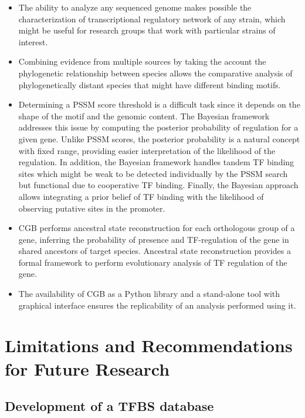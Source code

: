 \documentclass[12pt]{article}
\begin{document}
\begin{itemize}

\item The ability to analyze any sequenced genome makes possible the
  characterization of transcriptional regulatory network of any strain, which
  might be useful for research groups that work with particular strains of
  interest.

\item Combining evidence from multiple sources by taking the account the
  phylogenetic relationship between species allows the comparative analysis of
  phylogenetically distant species that might have different binding motifs.

\item Determining a PSSM score threshold is a difficult task since it depends
  on the shape of the motif and the genomic content. The Bayesian framework
  addresses this issue by computing the posterior probability of regulation for
  a given gene. Unlike PSSM scores, the posterior probability is a natural
  concept with fixed range, providing easier interpretation of the likelihood
  of the regulation. In addition, the Bayesian framework handles tandem TF
  binding sites which might be weak to be detected individually by the PSSM
  search but functional due to cooperative TF binding. Finally, the Bayesian
  approach allows integrating a prior belief of TF binding with the likelihood
  of observing putative sites in the promoter.

\item CGB performs ancestral state reconstruction for each orthologous group of
  a gene, inferring the probability of presence and TF-regulation of the gene
  in shared ancestors of target species. Ancestral state reconstruction
  provides a formal framework to perform evolutionary analysis of TF regulation
  of the gene.

\item The availability of CGB as a Python library and a stand-alone tool with
  graphical interface ensures the replicability of an analysis performed using
  it.
\end{itemize}

\section{Limitations and Recommendations for Future Research}

\subsection{Development of a TFBS database}
\end{document}
